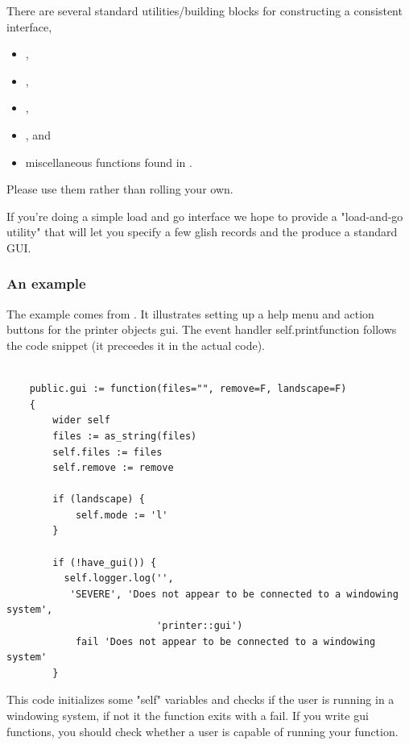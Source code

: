 There are several standard utilities/building blocks for constructing a 
consistent interface,  
\begin{itemize}
\item {},
\item {},
\item {},
\item {}, and
\item miscellaneous functions found in .
\end{itemize}
Please use them rather than rolling your own.

If you're
doing a simple load and go interface we hope to provide a "load-and-go utility"
that will let you specify a few glish records and the produce a standard GUI.
\subsubsection{An example}

The example comes from . 
It illustrates setting up a help menu and action buttons for
the printer objects gui.  The event handler self.printfunction follows the
code snippet (it preceedes it in the actual code).

\begin{verbatim}

    public.gui := function(files="", remove=F, landscape=F)
    {
        wider self
        files := as_string(files)
        self.files := files
        self.remove := remove
 
        if (landscape) {
            self.mode := 'l'
        }
 
        if (!have_gui()) {
          self.logger.log('', 
           'SEVERE', 'Does not appear to be connected to a windowing system',
                          'printer::gui')
            fail 'Does not appear to be connected to a windowing system'
        }
\end{verbatim}

This code initializes some "self" variables and checks if the
user is running in a windowing system, if not it the function exits with a
fail.  If you write gui functions, you should check whether a user is capable
of running your function.

